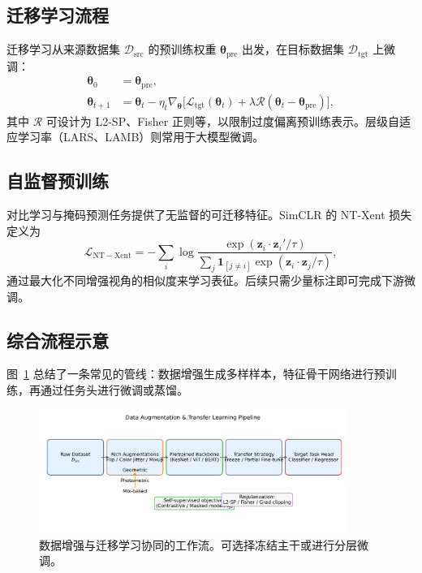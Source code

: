 \documentclass[UTF8,zihao=-4]{ctexart}
\begin{document}
\subsection{迁移学习流程}
迁移学习从来源数据集 $\mathcal{D}_{\mathrm{src}}$ 的预训练权重 $\boldsymbol{\theta}_{\mathrm{pre}}$ 出发，在目标数据集 $\mathcal{D}_{\mathrm{tgt}}$ 上微调：
\begin{align}
  \boldsymbol{\theta}_0 &= \boldsymbol{\theta}_{\mathrm{pre}}, \\
  \boldsymbol{\theta}_{t+1} &= \boldsymbol{\theta}_t - \eta_t \nabla_{\boldsymbol{\theta}} \bigl[\mathcal{L}_{\mathrm{tgt}}(\boldsymbol{\theta}_t) + \lambda \mathcal{R}(\boldsymbol{\theta}_t - \boldsymbol{\theta}_{\mathrm{pre}})\bigr],
\end{align}
其中 $\mathcal{R}$ 可设计为 L2-SP、Fisher 正则等，以限制过度偏离预训练表示。层级自适应学习率（LARS、LAMB）则常用于大模型微调。

\subsection{自监督预训练}
对比学习与掩码预测任务提供了无监督的可迁移特征。SimCLR 的 NT-Xent 损失定义为
\begin{equation}
  \mathcal{L}_{\mathrm{NT-Xent}} = -\sum_{i} \log \frac{\exp(\mathbf{z}_i \cdot \mathbf{z}_{i}' / \tau)}{\sum_{j} \mathbf{1}_{[j \neq i]} \exp(\mathbf{z}_i \cdot \mathbf{z}_j / \tau)},
\end{equation}
通过最大化不同增强视角的相似度来学习表征。后续只需少量标注即可完成下游微调。

\subsection{综合流程示意}
图~\ref{fig:augmentation_transfer_pipeline_cn} 总结了一条常见的管线：数据增强生成多样样本，特征骨干网络进行预训练，再通过任务头进行微调或蒸馏。

\begin{figure}[H]
  \centering
  \includegraphics[width=0.9\textwidth]{augmentation_transfer_pipeline.png}
  \caption{数据增强与迁移学习协同的工作流。可选择冻结主干或进行分层微调。}
  \label{fig:augmentation_transfer_pipeline_cn}
\end{figure}
\FloatBarrier
\end{document}
